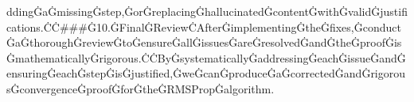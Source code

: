 \documentclass{article}
\begin{document}
ddingĠaĠmissingĠstep,ĠorĠreplacingĠhallucinatedĠcontentĠwithĠvalidĠjustifications.ĊĊ###Ġ10.ĠFinalĠReviewĊAfterĠimplementingĠtheĠfixes,ĠconductĠaĠthoroughĠreviewĠtoĠensureĠallĠissuesĠareĠresolvedĠandĠtheĠproofĠisĠmathematicallyĠrigorous.ĊĊByĠsystematicallyĠaddressingĠeachĠissueĠandĠensuringĠeachĠstepĠisĠjustified,ĠweĠcanĠproduceĠaĠcorrectedĠandĠrigorousĠconvergenceĠproofĠforĠtheĠRMSPropĠalgorithm.
\end{document}
